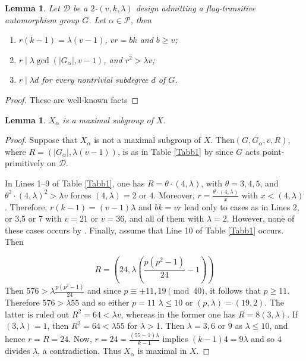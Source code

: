 \documentclass[a4paper,twopage,reqno,12pt]{amsart}
\newtheorem{lemma}[theorem]{Lemma}
\theoremstyle{definition}
\numberwithin{equation}{section}
\renewcommand{\leq}{\leqslant}
\renewcommand{\geq}{\geqslant}
\begin{document}
\bigskip

\begin{lemma} \label{lem:basic-params}
Let $\mathcal{D}$ be a $2$-$(v,k,\lambda)$ design admitting a flag-transitive
automorphism group $G$. Let $\alpha \in \mathcal{P}$, then
\begin{enumerate}
\item[\rm(i)]   $r(k-1)=\lambda(v-1)$, $vr=bk$ and $b \geq v$;
\item[\rm(ii)]  $r\mid \lambda \gcd\left(\left\vert G_\alpha\right\vert, v-1\right)$, and $r^{2}>\lambda v$;
\item[\rm(iii)]  $r\mid \lambda d$ for every nontrivial subdegree $d$ of $G$.
\end{enumerate}
\end{lemma}

\begin{proof}
These are well-known facts
\end{proof}



\begin{lemma}\label{lem:NotNov}
 $X_\alpha$ is a maximal subgroup of $X$.
\end{lemma}

\begin{proof}
Suppose that $X_\alpha$ is not a maximal subgroup of $X$. Then$(G,G_\alpha,v,R)$, where $R=(\left\vert G_{\alpha}\right\vert,\lambda (v-1))$, is as in Table \ref{Tabb1} by \cite{gmaxi} since $G$ acts point-primitively on $\mathcal{D}$.

In Lines 1--9 of Table \ref{Tabb1}, one has $R=\theta \cdot(4,\lambda)$, with $\theta=3,4,5$, and $\theta ^{2}\cdot(4,\lambda)^{2} >\lambda v$ forces $(4,\lambda)=2$ or $4$. Moreover, $r=\frac{\theta \cdot(4,\lambda)}{x}$ with $x<(4,\lambda)$. Therefore, $r(k-1)=(v-1)\lambda$ and $bk=vr$ lead only to cases as in Lines 2, or 3,5 or 7 with $v=21$ or $v=36$, and all of them with $\lambda=2$. However, none of these cases occurs by \cite[Theorem 1.1]{MZZZ}. 
Finally, assume that Line 10 of Table \ref{Tabb1} occurs. Then

\[
R=\left( 24,\lambda \left( \frac{p(p^{2}-1)}{24}-1\right) \right) 
\]%
Then $576>\lambda \frac{p(p^{2}-1)}{24}$ and since  $p\equiv \pm 11,19\pmod{40}$, it follows that $p\geq 11$. Therefore $576>\lambda 55$ and so
either $p=11$ $\lambda \leq 10$ or $(p,\lambda )=(19,2)$. The latter is
ruled out $R^{2}=64<\lambda v$, whereas in the former one has $R=8(3,\lambda
)$. If $(3,\lambda )=1$, then  $R^{2}=64<\lambda 55$ for $\lambda >1$. Then $%
\lambda =3,6$ or $9$ as $\lambda \leq 10$, and hence $r=R=24$. Now, $r=24=%
\frac{(55-1)\lambda }{k-1}$ implies $(k-1)4=9\lambda $ and so $4$ divides $%
\lambda $, a contradiction. Thus $X_\alpha$ is maximal in $X$.    
\end{proof}
\end{document}
